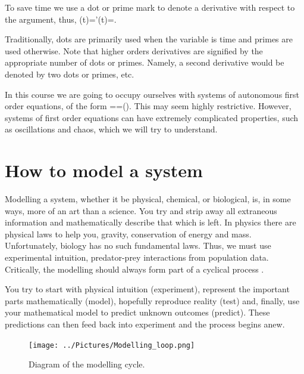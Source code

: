 \begin{defin}
To save time we use a dot or prime mark to denote a derivative with respect to the argument, thus,
\bb
{}(t)='(t)=.
\ee
\end{defin}
Traditionally, dots are primarily used when the variable is time and primes are used otherwise. Note that higher orders derivatives are signified by the appropriate number of dots or primes. Namely, a second derivative would be denoted by two dots or primes, etc.

In this course we are going to occupy ourselves with systems of autonomous first order equations, of the form
\bb
{}==().\label{ODE}
\ee
This may seem highly restrictive. However, systems of first order equations can have extremely complicated properties, such as oscillations and chaos, which we will try to understand.

\section{How to model a system}\label{How to model a system}
Modelling a system, whether it be physical, chemical, or biological, is, in some ways, more of an art than a science. You try and strip away all extraneous information and mathematically describe that which is left. In physics there are physical laws to help you, \eg gravity, conservation of energy and mass. Unfortunately, biology has no such fundamental laws. Thus, we must use experimental intuition, \eg predator-prey interactions from population data. Critically, the modelling should always form part of a cyclical process .

You try to start with physical intuition (experiment), represent the important parts mathematically (model), hopefully reproduce reality (test) and, finally, use your mathematical model to predict unknown outcomes (predict). These predictions can then feed back into experiment and the process begins anew.
\begin{figure}[!!!h!!!tb]
\centering
\texttt{[image: ../Pictures/Modelling\_loop.png]}
\caption{\label{Modelling_loop}Diagram of the modelling cycle.}
\end{figure}

